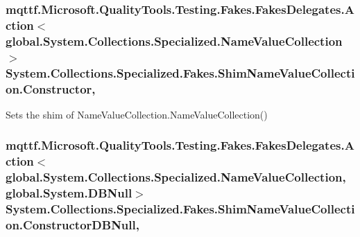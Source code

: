 \hypertarget{class_system_1_1_collections_1_1_specialized_1_1_fakes_1_1_shim_name_value_collection_a8f5355c9598edd3ed06440577c0db351}{
\subsubsection[{Constructor}]{\setlength{\rightskip}{0pt plus 5cm}mqttf.\-Microsoft.\-Quality\-Tools.\-Testing.\-Fakes.\-Fakes\-Delegates.\-Action$<$global.\-System.\-Collections.\-Specialized.\-Name\-Value\-Collection$>$ System.\-Collections.\-Specialized.\-Fakes.\-Shim\-Name\-Value\-Collection.\-Constructor\hspace{0.3cm}{\ttfamily [static]}, {\ttfamily [set]}}}\label{class_system_1_1_collections_1_1_specialized_1_1_fakes_1_1_shim_name_value_collection_a8f5355c9598edd3ed06440577c0db351}


Sets the shim of Name\-Value\-Collection.\-Name\-Value\-Collection()

\hypertarget{class_system_1_1_collections_1_1_specialized_1_1_fakes_1_1_shim_name_value_collection_af3d16cc74e92edefee249d943d614b11}{
\subsubsection[{Constructor\-D\-B\-Null}]{\setlength{\rightskip}{0pt plus 5cm}mqttf.\-Microsoft.\-Quality\-Tools.\-Testing.\-Fakes.\-Fakes\-Delegates.\-Action$<$global.\-System.\-Collections.\-Specialized.\-Name\-Value\-Collection, global.\-System.\-D\-B\-Null$>$ System.\-Collections.\-Specialized.\-Fakes.\-Shim\-Name\-Value\-Collection.\-Constructor\-D\-B\-Null\hspace{0.3cm}{\ttfamily [static]}, {\ttfamily [set]}}}\label{class_system_1_1_collections_1_1_specialized_1_1_fakes_1_1_shim_name_value_collection_af3d16cc74e92edefee249d943d614b11}


